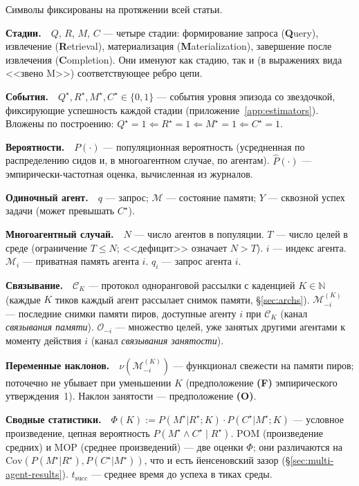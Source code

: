 \documentclass{article}
\begin{document}
Символы фиксированы на протяжении всей статьи.

\newcommand{\notentry}[1]{\par\smallskip\noindent\textbf{#1}\ \ }

\notentry{Стадии.}$Q$, $R$, $M$, $C$ --- четыре стадии: формирование запроса (\textbf{Q}uery), извлечение (\textbf{R}etrieval), материализация (\textbf{M}aterialization), завершение после извлечения (\textbf{C}ompletion). Они именуют как стадию, так и (в выражениях вида <<звено M>>) соответствующее ребро цепи.

\notentry{События.}$Q^\star, R^\star, M^\star, C^\star \in \{0, 1\}$ --- события уровня эпизода со звездочкой, фиксирующие успешность каждой стадии (приложение~\ref{app:estimators}). Вложены по построению: $Q^\star{=}1 \Leftarrow R^\star{=}1 \Leftarrow M^\star{=}1 \Leftarrow C^\star{=}1$.

\notentry{Вероятности.}$P(\cdot)$ --- популяционная вероятность (усредненная по распределению сидов и, в многоагентном случае, по агентам). $\hat{P}(\cdot)$ --- эмпирически-частотная оценка, вычисленная из журналов.

\notentry{Одиночный агент.}$q$ --- запрос; $\mathcal{M}$ --- состояние памяти; $Y$ --- сквозной успех задачи (может превышать $C^\star$).

\notentry{Многоагентный случай.}$N$ --- число агентов в популяции. $T$ --- число целей в среде (ограничение $T \le N$; <<дефицит>> означает $N > T$). $i$ --- индекс агента. $\mathcal{M}_i$ --- приватная память агента $i$. $q_i$ --- запрос агента $i$.

\notentry{Связывание.}$\mathcal{C}_K$ --- протокол одноранговой рассылки с каденцией $K \in \mathbb{N}$ (каждые $K$ тиков каждый агент рассылает снимок памяти, \S\ref{sec:archs}). $\mathcal{M}_{-i}^{(K)}$ --- последние снимки памяти пиров, доступные агенту $i$ при $\mathcal{C}_K$ (канал \emph{связывания памяти}). $\mathcal{O}_{-i}$ --- множество целей, уже занятых другими агентами к моменту действия $i$ (канал \emph{связывания занятости}).

\notentry{Переменные наклонов.}$\nu(\mathcal{M}_{-i}^{(K)})$ --- функционал свежести на памяти пиров; поточечно не убывает при уменьшении $K$ (предположение \textbf{(F)} эмпирического утверждения~1). Наклон занятости --- предположение \textbf{(O)}.

\notentry{Сводные статистики.}$\Phi(K) := P(M^\star|R^\star;K)\cdot P(C^\star|M^\star;K)$ --- условное произведение, цепная вероятность $P(M^\star \land C^\star \mid R^\star)$. POM (произведение средних) и MOP (среднее произведений) --- две оценки $\Phi$; они различаются на $\mathrm{Cov}(P(M^\star|R^\star), P(C^\star|M^\star))$, что и есть йенсеновский зазор (\S\ref{sec:multi-agent-results}). $t_{\mathrm{succ}}$ --- среднее время до успеха в тиках среды.
\par\smallskip
\end{document}
